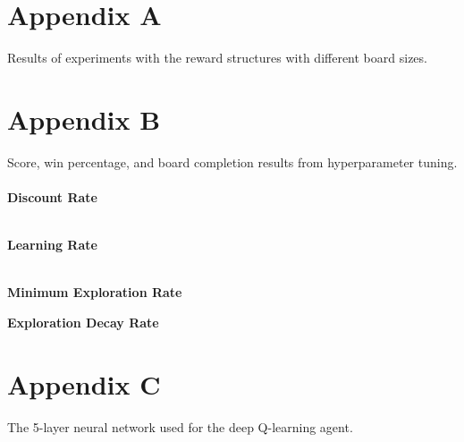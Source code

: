 \section*{Appendix A}

Results of experiments with the reward structures with different board sizes. 
\begin{figure}[h]
\centering
{}
\end{figure}

\newpage

\section*{Appendix B}

Score, win percentage, and board completion results from hyperparameter tuning.
\\\\
\textbf{Discount Rate}
\begin{figure}[h]
\centering
{}
\end{figure}\\
\textbf{Learning Rate}
\begin{figure}[h]
\end{figure}\\
\textbf{Minimum Exploration Rate}
\begin{figure}[h]
\end{figure}
\newpage
\textbf{Exploration Decay Rate}
\begin{figure}[h]
\end{figure}

\newpage

\section*{Appendix C}

The 5-layer neural network used for the deep Q-learning agent.

\begin{figure}[h]
\centering
{}
\end{figure}